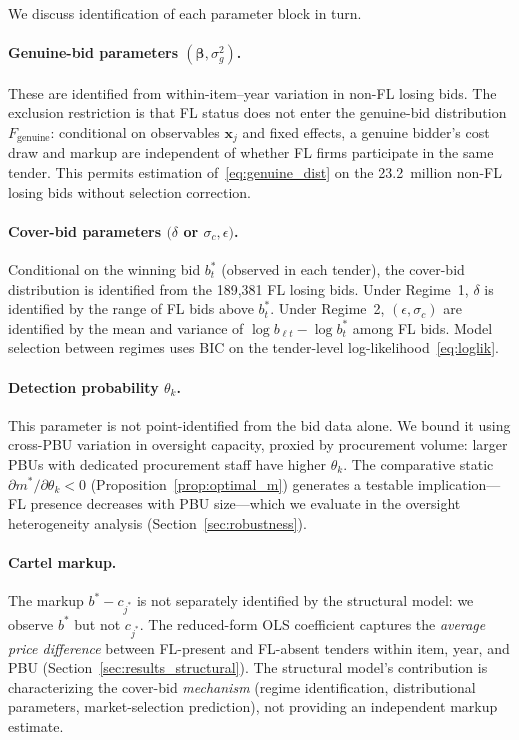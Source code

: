 We discuss identification of each parameter block in turn.

\paragraph{Genuine-bid parameters $(\boldsymbol{\beta}, \sigma_g^2)$.}
These are identified from within-item--year variation in non-FL
losing bids. The exclusion restriction is that FL status does not
enter the genuine-bid distribution $F_{\text{genuine}}$: conditional
on observables $\mathbf{x}_j$ and fixed effects, a genuine bidder's
cost draw and markup are independent of whether FL firms participate
in the same tender. This permits estimation of~\eqref{eq:genuine_dist}
on the 23.2~million non-FL losing bids without selection correction.

\paragraph{Cover-bid parameters $(\delta$ or $\sigma_c, \epsilon)$.}
Conditional on the winning bid $b^*_t$ (observed in each tender),
the cover-bid distribution is identified from the 189,381 FL losing
bids. Under Regime~1, $\delta$ is identified by the range of FL
bids above $b^*_t$. Under Regime~2, $(\epsilon, \sigma_c)$ are
identified by the mean and variance of $\log b_{\ell t} - \log b^*_t$
among FL bids. Model selection between regimes uses BIC on the
tender-level log-likelihood~\eqref{eq:loglik}.

\paragraph{Detection probability $\theta_k$.}
This parameter is not point-identified from the bid data alone.
We bound it using cross-PBU variation in oversight capacity, proxied
by procurement volume: larger PBUs with dedicated procurement staff
have higher $\theta_k$. The comparative static $\partial m^* /
\partial \theta_k < 0$ (Proposition~\ref{prop:optimal_m}) generates
a testable implication---FL presence decreases with PBU size---which
we evaluate in the oversight heterogeneity analysis
(Section~\ref{sec:robustness}).

\paragraph{Cartel markup.}
The markup $b^* - c_{j^*}$ is not separately identified by the
structural model: we observe $b^*$ but not $c_{j^*}$. The
reduced-form OLS coefficient captures the \emph{average price
difference} between FL-present and FL-absent tenders within item,
year, and PBU (Section~\ref{sec:results_structural}). The structural
model's contribution is characterizing the cover-bid \emph{mechanism}
(regime identification, distributional parameters, market-selection
prediction), not providing an independent markup estimate.

